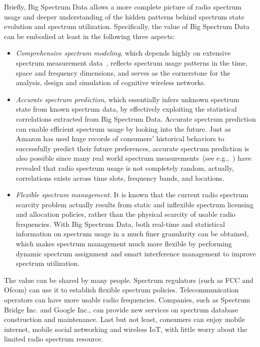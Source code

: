 \documentclass[12pt,draftcls,journal,letterpaper,oneside,onecolumn]{IEEEtran}
\begin{document}
Briefly, Big Spectrum Data allows a more complete picture of radio spectrum usage and deeper understanding of the hidden patterns behind spectrum state evolution and spectrum utilization. Specifically, the value of Big Spectrum Data can be embodied at least in the following three aspects:
\begin{itemize}
  \item \emph{Comprehensive spectrum modeling}, which depends highly on extensive spectrum measurement data~\cite{Spectrum_models}, reflects spectrum usage patterns in the time, space and frequency dimensions, and serves as the cornerstone for the analysis, design and simulation of cognitive wireless networks.
  \item \emph{Accurate spectrum prediction}, which essentially infers unknown spectrum state from known spectrum data, by effectively exploiting the statistical correlations extracted from Big Spectrum Data. Accurate spectrum prediction can enable efficient spectrum usage by looking into the future. Just as Amazon has used huge records of consumers' historical behaviors to successfully predict their future preferences, accurate spectrum prediction is also possible since many real world spectrum measurements~(see e.g.,~\cite{Spectrum_prediction}) have revealed that radio spectrum usage is not completely random, actually, correlations exists across time slots, frequency bands, and locations.
  \item \emph{Flexible spectrum management}. It is known that the current radio spectrum scarcity problem actually results from static and inflexible spectrum licensing and allocation policies, rather than the physical scarcity of usable radio frequencies. With Big Spectrum Data, both real-time and statistical information on spectrum usage in a much finer granularity can be obtained, which makes spectrum management much more flexible by performing dynamic spectrum assignment and smart interference management to improve spectrum utilization.
\end{itemize}

The value can be shared by many people. Spectrum regulators (such as FCC and Ofcom) can use it to establish flexible spectrum policies. Telecommunication operators can have more usable radio frequencies. Companies, such as Spectrum Bridge Inc. and Google Inc., can provide new services on spectrum database construction and maintenance. Last but not least, consumers can enjoy mobile internet, mobile social networking and wireless IoT, with little worry about the limited radio spectrum resource.
\\
\end{document}
